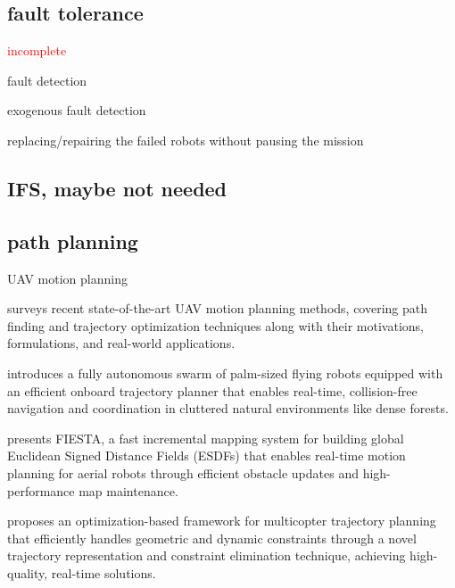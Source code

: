 \subsection{fault tolerance}
\cite{bjerknes2013fault}
\cite{tarapore2017generic}
\cite{winfield2006safety}
\cite{strobel2018managing} \textcolor{red}{incomplete}
\cite{pini2011task}
\cite{o2023predictive}
\cite{oladiran2019fault}

fault detection
\cite{tarapore2019fault}
\cite{khaldi2017monitoring}

exogenous fault detection
\cite{khadidos2015exogenous}
\cite{millard2016exogenous}
\cite{millard2013towards}

replacing/repairing the failed robots without pausing the mission
\cite{christensen2009fireflies}
\cite{varadharajan2020swarm}

\subsection{IFS, maybe not needed}
\cite{edition2000authoritative}
\cite{zhou2019review}
\cite{niu2021distributed}
\cite{sheng2021intermittent}
\cite{zhang2021intermittent}
\cite{syed2016novel}

\subsection{path planning}

UAV motion planning

\cite{quan2020survey} surveys recent state-of-the-art UAV motion planning methods, covering path finding and trajectory optimization techniques along with their motivations, formulations, and real-world applications.

\cite{zhou2022swarm} introduces a fully autonomous swarm of palm-sized flying robots equipped with an efficient onboard trajectory planner that enables real-time, collision-free navigation and coordination in cluttered natural environments like dense forests.

\cite{han2019fiesta} presents FIESTA, a fast incremental mapping system for building global Euclidean Signed Distance Fields (ESDFs) that enables real-time motion planning for aerial robots through efficient obstacle updates and high-performance map maintenance.

\cite{wang2022geometrically} proposes an optimization-based framework for multicopter trajectory planning that efficiently handles geometric and dynamic constraints through a novel trajectory representation and constraint elimination technique, achieving high-quality, real-time solutions.

